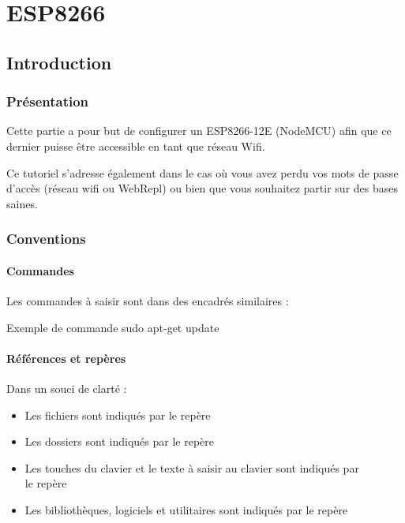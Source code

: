 \part{ESP8266}
\chapter{Introduction}     

\section{Présentation}

Cette partie a pour but de configurer un ESP8266-12E (NodeMCU) afin que ce dernier puisse être accessible en tant que réseau Wifi.

Ce tutoriel s'adresse également dans le cas où vous avez perdu vos mots de passe d'accès (réseau wifi ou WebRepl) ou bien que vous souhaitez partir sur des bases saines.\\


\section{Conventions}


\subsection*{Commandes}

Les commandes à saisir sont dans des encadrés similaires : \\
\begin{Bash}{Exemple de commande}
sudo apt-get update
\end{Bash}

\subsection*{Références et repères}

Dans un souci de clarté : 

\begin{itemize}


	\item Les fichiers sont indiqués par le repère 
	\item Les dossiers sont indiqués par le repère 
	\item Les touches du clavier et le texte à saisir au clavier sont indiqués par \\le repère 
	\item Les bibliothèques, logiciels et utilitaires sont indiqués par le repère 

\end{itemize}



